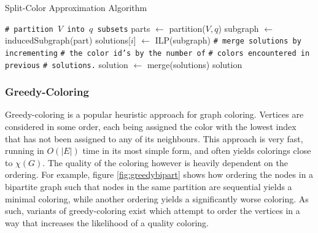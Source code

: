 \documentclass[twocolumn]{article}
\begin{document}
\begin{algorithm}
	\caption{Split-Color Approximation Algorithm}
	\begin{algorithmic}
			\State \texttt{\# partition $V$ into $q$ subsets}
			\State parts $\gets$ \textsf{partition}($V, q$)
				\State subgraph $\gets$ \textsf{inducedSubgraph}(part)
				\State solutions[$i$] $\gets$ \textsf{ILP}(subgraph)
			\EndFor
			\State \texttt{\# merge solutions by incrementing} 
			\State \texttt{\# the color id's by the number of} 
			\State \texttt{\# colors encountered in previous}
			\State \texttt{\# solutions.}
			\State solution $\gets$ \textsf{merge}(solutions)
			\State \Return solution 
		\EndFunction
	\end{algorithmic}
	\label{alg:splitcolor}
\end{algorithm}

\subsubsection{Greedy-Coloring}
Greedy-coloring is a popular heuristic approach for graph coloring. Vertices are considered in some order, each being assigned the color with the lowest index that has not been assigned to any of its neighbours. This approach is very fast, running in $O(|E|)$ time in its most simple form, and often yields colorings close to $\chi(G)$. The quality of the coloring however is heavily dependent on the ordering. For example, figure \ref{fig:greedybipart} shows how ordering the nodes in a bipartite graph such that nodes in the same partition are sequential yields a minimal coloring, while another ordering yields a significantly worse coloring. As such, variants of greedy-coloring exist which attempt to order the vertices in a way that increases the likelihood of a quality coloring.
\end{document}
